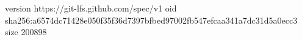 version https://git-lfs.github.com/spec/v1
oid sha256:a6574dc71428e050f35f36d7397bfbed97002fb547efcaa341a7dc31d5a0ecc3
size 200898
